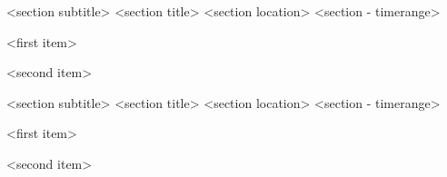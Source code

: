 \begin{cventries}
\cventry
    {<section subtitle>}
    {<section title>}
    {<section location>}
    {<section - timerange>}
    {
        \begin{cvitems}
            \item {<first item>}
            \item {<second item>}
        \end{cvitems}
    }

    
\cventry
    {<section subtitle>}
    {<section title>}
    {<section location>}
    {<section - timerange>}
    {
        \begin{cvitems}
            \item {<first item>}
            \item {<second item>}
        \end{cvitems}
    }
\end{cventries}

